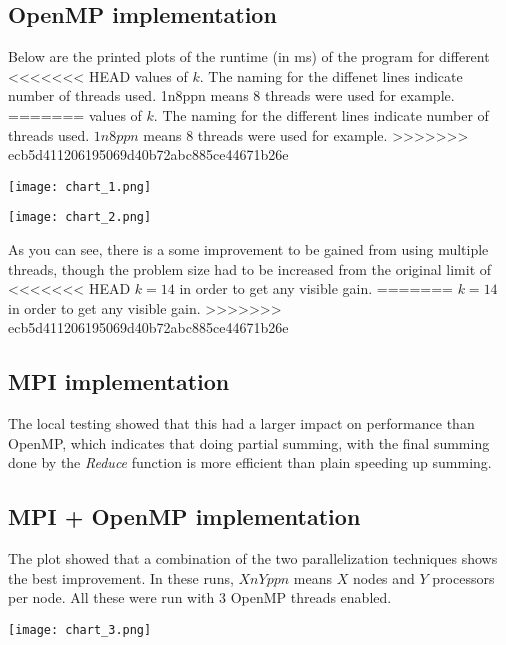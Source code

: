 \documentclass[fontsize=11pt,paper=a4,titlepage]{report}
\begin{document}
\clearpage
\subsection{OpenMP implementation}

Below are the printed plots of the runtime (in ms) of the program for different
<<<<<<< HEAD
values of $k$. The naming for the diffenet lines indicate number of threads used.
1n8ppn means 8 threads were used for example.
=======
values of $k$. The naming for the different lines indicate number of threads used.
$1n8ppn$ means 8 threads were used for example.
>>>>>>> ecb5d411206195069d40b72abc885ce44671b26e

\begin{center}
	\texttt{[image: chart\_1.png]}
\end{center}

\begin{center}
	\texttt{[image: chart\_2.png]}
\end{center}

As you can see, there is a some improvement to be gained from using multiple
threads, though the problem size had to be increased from the original limit of
<<<<<<< HEAD
$k = 14$ in order to get any visible gain.
=======
$k=14$ in order to get any visible gain.
>>>>>>> ecb5d411206195069d40b72abc885ce44671b26e

\subsection{MPI implementation}

The local testing showed that this had a larger impact on performance than
OpenMP, which indicates that doing partial summing, with the final summing done
by the \textit{Reduce} function is more efficient than plain speeding up summing.

\subsection{MPI + OpenMP implementation}

The plot showed that a combination of the two parallelization techniques shows
the best improvement. In these runs, $XnYppn$ means $X$ nodes and $Y$ processors per
node. All these were run with 3 OpenMP threads enabled.

\begin{center}
	\texttt{[image: chart\_3.png]}
\end{center}
\end{document}
